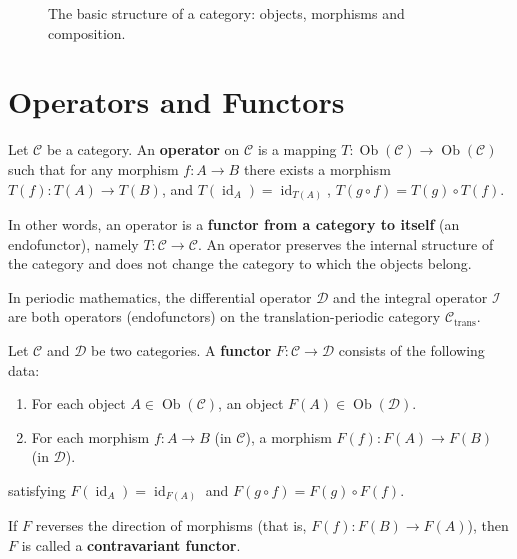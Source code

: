 \begin{figure}[htbp]
\centering
{}
\caption{The basic structure of a category: objects, morphisms and composition.}
\label{fig:category_structure}
\end{figure}

\section{Operators and Functors}\label{sec:operator_vs_functor}

\begin{definition}[Operator]\label{def:operator}
Let $\mathcal{C}$ be a category. An \textbf{operator} on $\mathcal{C}$ is a mapping $T: \operatorname{Ob}(\mathcal{C}) \to \operatorname{Ob}(\mathcal{C})$ such that for any morphism $f: A \to B$ there exists a morphism $T(f): T(A) \to T(B)$, and $T(\operatorname{id}_A) = \operatorname{id}_{T(A)}$, $T(g \circ f) = T(g) \circ T(f)$.

In other words, an operator is a \textbf{functor from a category to itself} (an endofunctor), namely $T: \mathcal{C} \to \mathcal{C}$. An operator preserves the internal structure of the category and does not change the category to which the objects belong.

In periodic mathematics, the differential operator $\mathcal{D}$ and the integral operator $\mathcal{I}$ are both operators (endofunctors) on the translation-periodic category $\mathcal{C}_{\text{trans}}$.
\end{definition}

\begin{definition}[Functor]\label{def:functor}
Let $\mathcal{C}$ and $\mathcal{D}$ be two categories. A \textbf{functor} $F: \mathcal{C} \to \mathcal{D}$ consists of the following data:
\begin{enumerate}[label=(\roman*)]
    \item For each object $A \in \operatorname{Ob}(\mathcal{C})$, an object $F(A) \in \operatorname{Ob}(\mathcal{D})$.
    \item For each morphism $f: A \to B$ (in $\mathcal{C}$), a morphism $F(f): F(A) \to F(B)$ (in $\mathcal{D}$).
\end{enumerate}
satisfying $F(\operatorname{id}_A) = \operatorname{id}_{F(A)}$ and $F(g \circ f) = F(g) \circ F(f)$.

If $F$ reverses the direction of morphisms (that is, $F(f): F(B) \to F(A)$), then $F$ is called a \textbf{contravariant functor}.
\end{definition}

